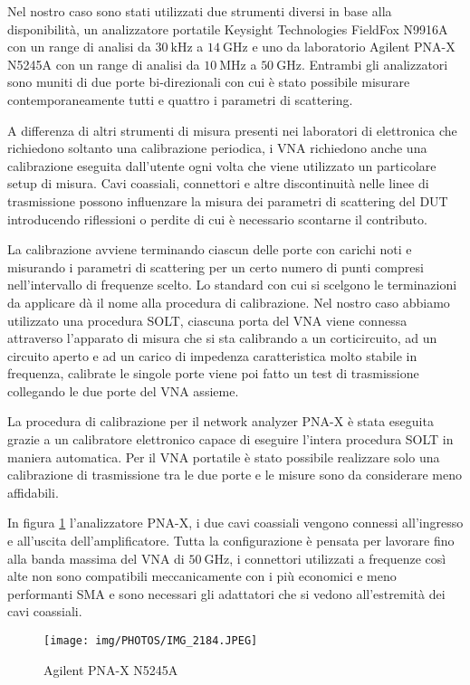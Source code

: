\documentclass[12pt,oneside]{book}
\begin{document}
Nel nostro caso sono stati utilizzati due strumenti diversi in base alla disponibilità, un analizzatore portatile Keysight Technologies FieldFox N9916A con un range di analisi da $\SI{30}{\kilo\hertz}$ a $\SI{14}{\giga\hertz}$ e uno da laboratorio Agilent PNA-X N5245A con un range di analisi da $\SI{10}{\mega\hertz}$ a $\SI{50}{\giga\hertz}$. Entrambi gli analizzatori sono muniti di due porte bi-direzionali con cui è stato possibile misurare contemporaneamente tutti e quattro i parametri di scattering.

A differenza di altri strumenti di misura presenti nei laboratori di elettronica che richiedono soltanto una calibrazione periodica, i VNA richiedono anche una calibrazione eseguita dall'utente ogni volta che viene utilizzato un particolare setup di misura. Cavi coassiali, connettori e altre discontinuità nelle linee di trasmissione possono influenzare la misura dei parametri di scattering del DUT introducendo riflessioni o perdite di cui è necessario scontarne il contributo.

La calibrazione avviene terminando ciascun delle porte con carichi noti e misurando i parametri di scattering per un certo numero di punti compresi nell'intervallo di frequenze scelto. Lo standard con cui si scelgono le terminazioni da applicare dà il nome alla procedura di calibrazione. Nel nostro caso abbiamo utilizzato una procedura SOLT, ciascuna porta del VNA viene connessa attraverso l'apparato di misura che si sta calibrando a un corticircuito, ad un circuito aperto e ad un carico di impedenza caratteristica molto stabile in frequenza, calibrate le singole porte viene poi fatto un test di trasmissione collegando le due porte del VNA assieme.

La procedura di calibrazione per il network analyzer PNA-X è stata eseguita grazie a un calibratore elettronico capace di eseguire l'intera procedura SOLT in maniera automatica. Per il VNA portatile è stato possibile realizzare solo una calibrazione di trasmissione tra le due porte e le misure sono da considerare meno affidabili.

In figura \ref{PNA-X} l'analizzatore PNA-X, i due cavi coassiali vengono connessi all'ingresso e all'uscita dell'amplificatore. Tutta la configurazione è pensata per lavorare fino alla banda massima del VNA di $\SI{50}{\giga\hertz}$, i connettori utilizzati a frequenze così alte non sono compatibili meccanicamente con i più economici e meno performanti SMA e sono necessari gli adattatori che si vedono all'estremità dei cavi coassiali.
\begin{figure}[!htbp]
    \centering
        \texttt{[image: img/PHOTOS/IMG\_2184.JPEG]}
        \caption{Agilent PNA-X N5245A}
        \label{PNA-X}
\end{figure}
\end{document}
